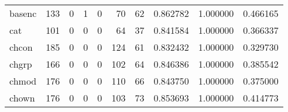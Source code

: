 \begin{tabular}{lrrrrrrrrr}
basenc    &                                   133 &                                                  0 &                                                  1 &                                                  0 &                                                 70 &                                                 62 &                                           0.862782 &                               1.000000 &                             0.466165 \\
cat       &                                   101 &                                                  0 &                                                  0 &                                                  0 &                                                 64 &                                                 37 &                                           0.841584 &                               1.000000 &                             0.366337 \\
chcon     &                                   185 &                                                  0 &                                                  0 &                                                  0 &                                                124 &                                                 61 &                                           0.832432 &                               1.000000 &                             0.329730 \\
chgrp     &                                   166 &                                                  0 &                                                  0 &                                                  0 &                                                102 &                                                 64 &                                           0.846386 &                               1.000000 &                             0.385542 \\
chmod     &                                   176 &                                                  0 &                                                  0 &                                                  0 &                                                110 &                                                 66 &                                           0.843750 &                               1.000000 &                             0.375000 \\
chown     &                                   176 &                                                  0 &                                                  0 &                                                  0 &                                                103 &                                                 73 &                                           0.853693 &                               1.000000 &                             0.414773 \\

\end{tabular}
